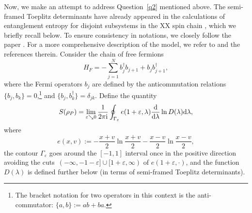 \documentclass[10pt,a4paper]{amsart}
\numberwithin{equation}{section}
\newcommand{\la}{\lambda}
\begin{document}
	Now, we make an attempt to address Question~\ref{q2} mentioned above. The semi-framed Toeplitz determinants have already appeared in the calculations of entanglement entropy for disjoint subsystems in the XX spin chain \cite{BGIKMMV,JK}, which we briefly recall below. To ensure consistency in notations, we closely follow the paper \cite{BGIKMMV}. For a more comprehensive description of the model, we refer to \cite{BGIKMMV,JK} and the references therein. Consider the chain of free fermions%
\begin{equation}\label{FFchain}
		H_F = -\sum_{j=1}^{N}b_j^\dagger b_{j+1} + b_jb_{j+1}^\dagger,
\end{equation}
	where the Fermi operators $b_j$ are defined by the anticommutation relations $\{b_j,b_k\} = 0$,\footnote{The bracket notation for two operators in this context is the anti-commutator: $\{a,b\}:=ab+ba$.} and $\big\{b_j,b_k^\dagger\big\}= \delta_{jk}$. Define the quantity
	\begin{equation}\label{eq:entr-int}
		S(\rho_P) = \lim_{\varepsilon\searrow 0} \frac{1}{2\pi {\rm i}} \oint_{\Gamma_\varepsilon} e(1+\varepsilon,\lambda)\frac{\rm d}{{\rm d}\lambda}\ln D(\lambda) {\rm d}\lambda,
	\end{equation}
	where
	\begin{equation*}
		 e(x,v) := -\frac{x+v}{2}\ln\frac{x+v}{2}-\frac{x-v}{2}\ln\frac{x-v}{2},
	\end{equation*}
	the contour $\Gamma_\varepsilon$ goes around the $[-1,1]$ interval once in the positive direction avoiding the cuts~${(-\infty,-1-\varepsilon]\cup[1+\varepsilon,\infty)}$ of $ e(1+\varepsilon,\cdot)$, and the function $D(\la)$ is defined further below (in terms of semi-framed Toeplitz determinants).
	
\end{document}

